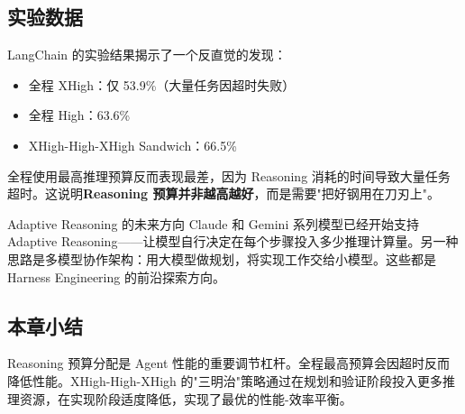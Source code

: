 \subsection{实验数据}

LangChain 的实验结果揭示了一个反直觉的发现：

\begin{itemize}[leftmargin=1.5em]
    \item 全程 XHigh：仅 53.9\%（大量任务因超时失败）
    \item 全程 High：63.6\%
    \item XHigh-High-XHigh Sandwich：66.5\%
\end{itemize}

全程使用最高推理预算反而表现最差，因为 Reasoning 消耗的时间导致大量任务超时。这说明\textbf{Reasoning 预算并非越高越好}，而是需要"把好钢用在刀刃上"。

\begin{knowledgebox}{Adaptive Reasoning 的未来方向}
Claude 和 Gemini 系列模型已经开始支持 Adaptive Reasoning——让模型自行决定在每个步骤投入多少推理计算量。另一种思路是多模型协作架构：用大模型做规划，将实现工作交给小模型。这些都是 Harness Engineering 的前沿探索方向。
\end{knowledgebox}

\subsection{本章小结}

Reasoning 预算分配是 Agent 性能的重要调节杠杆。全程最高预算会因超时反而降低性能。XHigh-High-XHigh 的"三明治"策略通过在规划和验证阶段投入更多推理资源，在实现阶段适度降低，实现了最优的性能-效率平衡。


